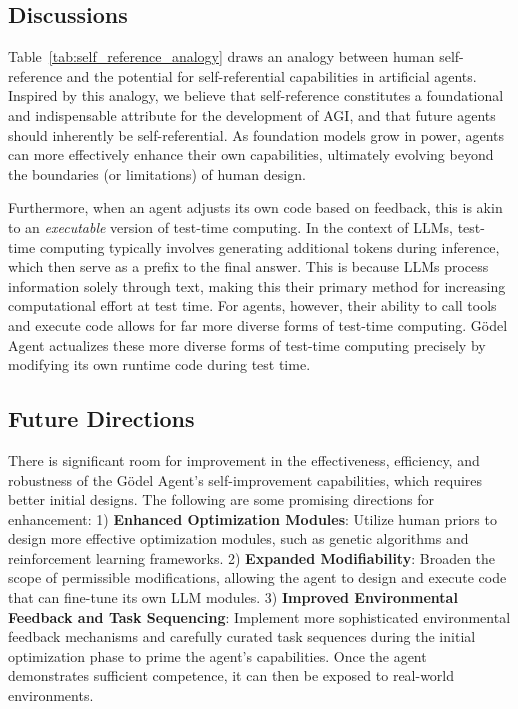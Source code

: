 \documentclass[11pt]{article}
\newcommand{\framework}{Gödel Agent\xspace}
\begin{document}
\subsection{Discussions}





Table~\ref{tab:self_reference_analogy} draws an analogy between human self-reference and the potential for self-referential capabilities in artificial agents. 
Inspired by this analogy, we believe that self-reference constitutes a foundational and indispensable attribute for the development of AGI, and that future agents should inherently be self-referential.
As foundation models grow in power, agents can more effectively enhance their own capabilities, ultimately evolving beyond the boundaries (or limitations) of human design.

Furthermore, when an agent adjusts its own code based on feedback, this is akin to an \textit{executable} version of test-time computing. In the context of LLMs, test-time computing typically involves generating additional tokens during inference, which then serve as a prefix to the final answer. This is because LLMs process information solely through text, making this their primary method for increasing computational effort at test time. For agents, however, their ability to call tools and execute code allows for far more diverse forms of test-time computing. \framework{} actualizes these more diverse forms of test-time computing precisely by modifying its own runtime code during test time.


\subsection{Future Directions}




There is significant room for improvement in the effectiveness, efficiency, and robustness of the \framework{}'s self-improvement capabilities, which requires better initial designs. The following are some promising directions for enhancement:
1) \textbf{Enhanced Optimization Modules}: Utilize human priors to design more effective optimization modules, such as genetic algorithms and reinforcement learning frameworks.
2) \textbf{Expanded Modifiability}: Broaden the scope of permissible modifications, allowing the agent to design and execute code that can fine-tune its own LLM modules.
3) \textbf{Improved Environmental Feedback and Task Sequencing}: Implement more sophisticated environmental feedback mechanisms and carefully curated task sequences during the initial optimization phase to prime the agent's capabilities. Once the agent demonstrates sufficient competence, it can then be exposed to real-world environments.
\end{document}
